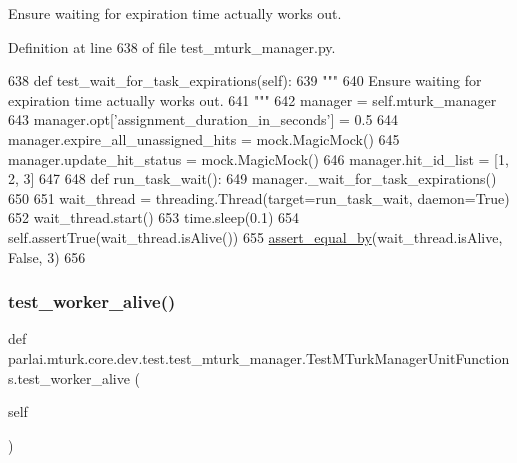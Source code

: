 \begin{DoxyVerb}Ensure waiting for expiration time actually works out.
\end{DoxyVerb}
 

Definition at line 638 of file test\+\_\+mturk\+\_\+manager.\+py.


\begin{DoxyCode}
638     \textcolor{keyword}{def }test\_wait\_for\_task\_expirations(self):
639         \textcolor{stringliteral}{"""}
640 \textcolor{stringliteral}{        Ensure waiting for expiration time actually works out.}
641 \textcolor{stringliteral}{        """}
642         manager = self.mturk\_manager
643         manager.opt[\textcolor{stringliteral}{'assignment\_duration\_in\_seconds'}] = 0.5
644         manager.expire\_all\_unassigned\_hits = mock.MagicMock()
645         manager.update\_hit\_status = mock.MagicMock()
646         manager.hit\_id\_list = [1, 2, 3]
647 
648         \textcolor{keyword}{def }run\_task\_wait():
649             manager.\_wait\_for\_task\_expirations()
650 
651         wait\_thread = threading.Thread(target=run\_task\_wait, daemon=\textcolor{keyword}{True})
652         wait\_thread.start()
653         time.sleep(0.1)
654         self.assertTrue(wait\_thread.isAlive())
655         \hyperlink{namespaceparlai_1_1mturk_1_1core_1_1test_1_1test__mturk__manager_a1fd7ac4fedefa65d2416601107dbe44c}{assert\_equal\_by}(wait\_thread.isAlive, \textcolor{keyword}{False}, 3)
656 
\end{DoxyCode}
\mbox{\label{classparlai_1_1mturk_1_1core_1_1dev_1_1test_1_1test__mturk__manager_1_1TestMTurkManagerUnitFunctions_a0a941d24785aa95bd1754ec985899eae}} 
\subsubsection{\texorpdfstring{test\+\_\+worker\+\_\+alive()}{test\_worker\_alive()}}
{\footnotesize\ttfamily def parlai.\+mturk.\+core.\+dev.\+test.\+test\+\_\+mturk\+\_\+manager.\+Test\+M\+Turk\+Manager\+Unit\+Functions.\+test\+\_\+worker\+\_\+alive (\begin{DoxyParamCaption}\item[{}]{self }\end{DoxyParamCaption})}



